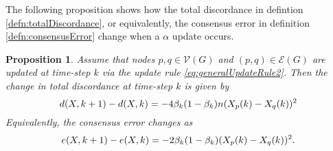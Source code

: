 \documentclass{article}
\newtheorem{proposition}{Proposition}
\theoremstyle{remark}
\begin{document}
The following proposition shows how the total discordance in defintion \ref{defn:totalDiscordance}, or equivalently, the consensus error in definition \ref{defn:consensusError} change when a $\alpha$ update occurs.
\begin{proposition}{\label{prop:discChange}}
	Assume that nodes $p,q\in\mathcal{V}(G)$ and $(p,q)\in\mathcal{E}(G)$ are updated at time-step $k$ via the update rule \eqref{eq:generalUpdateRule2}. Then the change in total discordance at time-step $k$ is given by
\begin{equation}{\label{prop:eq:discIncrement}}
	d(X,k+1)-d(X,k) = -4\beta_k(1-\beta_k)n(X_p(k)-X_q(k))^2
\end{equation}
Equivalently, the consensus error changes as
\begin{equation}{\label{prop:eq:errorIncrement}}
	e(X,k+1) - e(X,k) = -2\beta_k(1-\beta_k)(X_p(k)-X_q(k))^2.
\end{equation}
\end{proposition}
\end{document}
